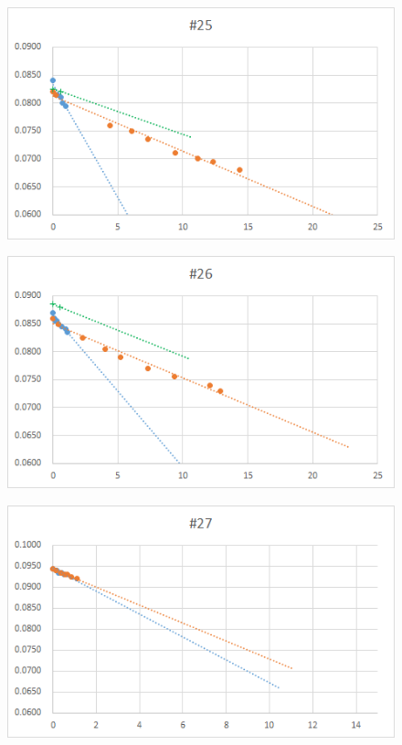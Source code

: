 \documentclass[12pt,a4paper]{jarticle}
\begin{document}
\begin{figure}[htbp]
  \centering
     \includegraphics[width=120mm]{vol_025.png}
\end{figure}
\begin{figure}[htbp]
  \centering
     \includegraphics[width=120mm]{vol_026.png}
\end{figure}
\begin{figure}[htbp]
  \centering
     \includegraphics[width=120mm]{vol_027.png}
\end{figure}
\end{document}
